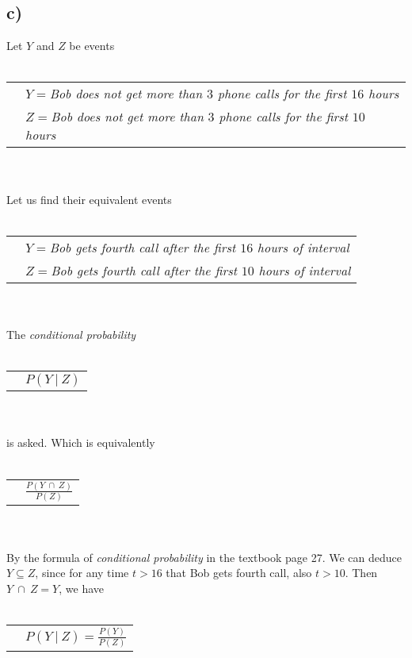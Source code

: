 \documentclass[12pt]{article}
\begin{document}
\subsection*{c)}
Let $Y$ and $Z$ be events
\\ \\
\begin{tabular}{l l}
    &$Y=$\textit{Bob does not get more than $3$ phone calls for the first $16$ hours}\\
    &$Z=$\textit{Bob does not get more than $3$ phone calls for the first $10$ hours}\\
\end{tabular}
\\ \\
Let us find their equivalent events 
\\ \\
\begin{tabular}{l l}
    &$Y=$\textit{Bob gets fourth call after the first $16$ hours of interval}\\
    &$Z=$\textit{Bob gets fourth call after the first $10$ hours of interval}\\
\end{tabular}
\\ \\
The \textit{conditional probability}
\\ \\
\begin{tabular}{l l}
    &$P(Y\ |\ Z)$\\
\end{tabular}
\\ \\
is asked. Which is equivalently
\\ \\
\begin{tabular}{l l}
    &$\frac{P(Y\ \cap\ Z)}{P(Z)}$\\
\end{tabular}
\\ \\
By the formula of \textit{conditional probability} in the textbook page 27.
We can deduce $Y \subseteq Z$, since for any time $t > 16$ that Bob gets fourth call, also $t > 10$.
Then $Y\ \cap\ Z=Y$, we have
\\ \\
\begin{tabular}{l l}
    &$P(Y\ |\ Z)=\frac{P(Y)}{P(Z)}$\\
\end{tabular}
\\ \\
\end{document}
